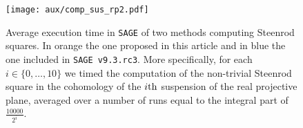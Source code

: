 \begin{figure}
	\texttt{[image: aux/comp\_sus\_rp2.pdf]}
	\caption{Average execution time in \texttt{SAGE} of two methods computing Steenrod squares. In orange the one proposed in this article and in blue the one included in \texttt{SAGE v9.3.rc3}. More specifically, for each $i \in \{0, \dots, 10\}$ we timed the computation of the non-trivial Steenrod square in the cohomology of the $i\mathrm{th}$ suspension of the real projective plane, averaged over a number of runs equal to the integral part of $\frac{10000}{2^i}$.}
	\label{f:comparison}
\end{figure}